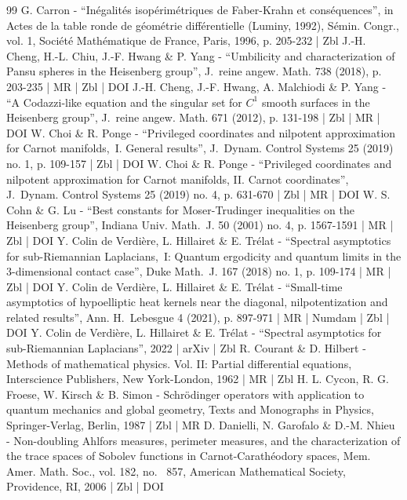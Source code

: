 \documentclass[10pt]{amsart}
\theoremstyle{definition}
\newcommand{\1}{\mathbbm{1}}
\begin{document}
\begin{thebibliography}{99}
G. Carron - “Inégalités isopérimétriques de Faber-Krahn et conséquences”, in Actes de la table ronde de géométrie différentielle (Luminy, 1992), Sémin. Congr., vol. 1, Société Mathématique de France, Paris, 1996, p. 205-232 | Zbl
J.-H. Cheng, H.-L. Chiu, J.-F. Hwang \& P. Yang - “Umbilicity and characterization of Pansu spheres in the Heisenberg group”, J. reine angew. Math. 738 (2018), p. 203-235 | MR | Zbl | DOI
J.-H. Cheng, J.-F. Hwang, A. Malchiodi \& P. Yang - “A Codazzi-like equation and the singular set for $C^1$ smooth surfaces in the Heisenberg group”, J. reine angew. Math. 671 (2012), p. 131-198 | Zbl | MR | DOI
W. Choi \& R. Ponge - “Privileged coordinates and nilpotent approximation for Carnot manifolds, I. General results”, J. Dynam. Control Systems 25 (2019) no. 1, p. 109-157 | Zbl | DOI
W. Choi \& R. Ponge - “Privileged coordinates and nilpotent approximation for Carnot manifolds, II. Carnot coordinates”, J. Dynam. Control Systems 25 (2019) no. 4, p. 631-670 | Zbl | MR | DOI
W. S. Cohn \& G. Lu - “Best constants for Moser-Trudinger inequalities on the Heisenberg group”, Indiana Univ. Math. J. 50 (2001) no. 4, p. 1567-1591 | MR | Zbl | DOI
Y. Colin de Verdière, L. Hillairet \& E. Trélat - “Spectral asymptotics for sub-Riemannian Laplacians, I: Quantum ergodicity and quantum limits in the 3-dimensional contact case”, Duke Math. J. 167 (2018) no. 1, p. 109-174 | MR | Zbl | DOI
Y. Colin de Verdière, L. Hillairet \& E. Trélat - “Small-time asymptotics of hypoelliptic heat kernels near the diagonal, nilpotentization and related results”, Ann. H. Lebesgue 4 (2021), p. 897-971 | MR | Numdam | Zbl | DOI
Y. Colin de Verdière, L. Hillairet \& E. Trélat - “Spectral asymptotics for sub-Riemannian Laplacians”, 2022 | arXiv | Zbl
R. Courant \& D. Hilbert - Methods of mathematical physics. Vol. II: Partial differential equations, Interscience Publishers, New York-London, 1962 | MR | Zbl
H. L. Cycon, R. G. Froese, W. Kirsch \& B. Simon - Schrödinger operators with application to quantum mechanics and global geometry, Texts and Monographs in Physics, Springer-Verlag, Berlin, 1987 | Zbl | MR
D. Danielli, N. Garofalo \& D.-M. Nhieu - Non-doubling Ahlfors measures, perimeter measures, and the characterization of the trace spaces of Sobolev functions in Carnot-Carathéodory spaces, Mem. Amer. Math. Soc., vol. 182, no.  857, American Mathematical Society, Providence, RI, 2006 | Zbl | DOI

\end{thebibliography}
\end{document}

